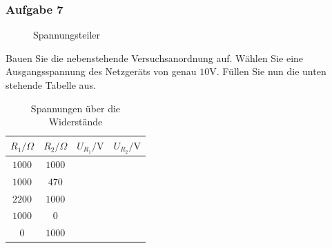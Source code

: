 \subsubsection{Aufgabe 7}
\begin{figure}[H]
\centering
{}
\caption{Spannungsteiler}
\end{figure} 
Bauen Sie die nebenstehende Versuchsanordnung auf. Wählen Sie eine Ausgangsspannung des Netzgeräts von genau $10\text{V}$. Füllen Sie nun die unten stehende Tabelle aus.
\begin{table}[H]
\centering
\begin{tabular}{cccc}\hline
$R_1/\Omega$&$R_2/\Omega$&$U_{R_1}/\text{V}$&$U_{R_2}/\text{V}$\\\hline
$1000$&$1000$&\\
$1000$&$470$&\\
$2200$&$1000$&\\
$1000$&$0$&\\
$0$&$1000$&\\\hline
\end{tabular}
\caption{Spannungen über die Widerstände}
\end{table}
